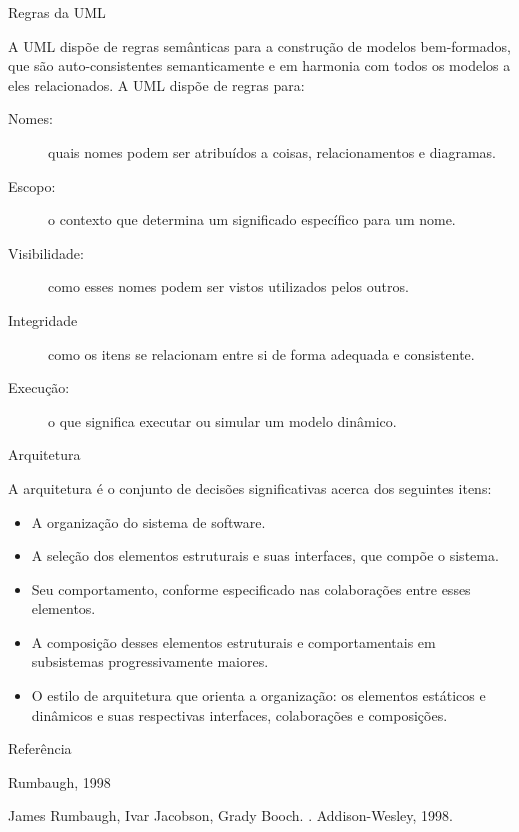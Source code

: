 \begin{frame}{Regras da UML}
  
  A UML dispõe de regras semânticas para a construção de modelos
  \alert{bem-formados}, que são auto-consistentes semanticamente e em
  harmonia com todos os modelos a eles relacionados. A UML dispõe de
  regras para:

  \begin{description}
  \item[Nomes:] quais nomes podem ser atribuídos a coisas,
    relacionamentos e diagramas.\pause
  \item[Escopo:] o contexto que determina um significado específico
    para um nome.\pause
  \item[Visibilidade:] como esses nomes podem ser vistos utilizados 
    pelos outros.\pause
  \item[Integridade] como os itens se relacionam entre si de forma 
    adequada e consistente.\pause
  \item[Execução:] o que significa executar ou simular um modelo
    dinâmico.
  \end{description}
  
\end{frame}

\begin{frame}{Arquitetura}
  
  A arquitetura é o conjunto de decisões significativas acerca dos
  seguintes itens:

  \begin{itemize}
  \item A organização do sistema de software.\pause
  \item A seleção dos elementos estruturais e suas interfaces, que
    compõe o sistema.\pause
  \item Seu comportamento, conforme especificado nas colaborações 
    entre esses elementos.\pause
  \item A composição desses elementos estruturais e comportamentais 
    em subsistemas progressivamente maiores.\pause
  \item O estilo de arquitetura que orienta a organização: os elementos 
    estáticos e dinâmicos e suas respectivas interfaces, colaborações 
    e composições.
  \end{itemize}

\end{frame}

\begin{frame}[fragile]{Referência}
  \begin{thebibliography} {Rumbaugh, 1998}

    James Rumbaugh, Ivar Jacobson, Grady Booch.
    .
    \newblock	   Addison-Wesley, 1998.

  \end{thebibliography}
\end{frame}
